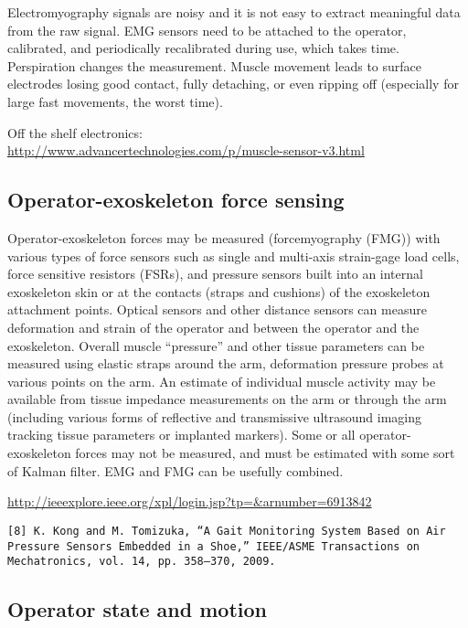 \documentclass[letterpaper,12pt,fullpage]{article}
\begin{document}
Electromyography 
signals are noisy and it is not easy to extract
meaningful data from the raw signal. 
EMG sensors
need to be attached to the operator, calibrated,
and periodically recalibrated during use, which takes time.
Perspiration changes the measurement. 
Muscle movement leads to surface electrodes losing good contact,
fully detaching, or
even ripping off (especially for large fast
movements, the worst time).

Off the shelf electronics:\\
\url{http://www.advancertechnologies.com/p/muscle-sensor-v3.html}

\subsection{Operator-exoskeleton force sensing}

Operator-exoskeleton forces may be measured (forcemyography (FMG))
with various types of
force sensors such as single and multi-axis strain-gage load cells,
force sensitive resistors (FSRs), and pressure sensors built into an internal exoskeleton skin or at the
contacts (straps and cushions) of the exoskeleton attachment points.
Optical sensors and other distance sensors can measure deformation and
strain of the operator and between the operator and the exoskeleton.
Overall muscle ``pressure'' and other tissue parameters can be measured using
elastic straps around the arm, deformation pressure probes at various
points on the arm.
An estimate of individual muscle activity
may be available from tissue impedance measurements on the arm
or through the arm (including various forms of reflective and transmissive
ultrasound imaging tracking tissue parameters or implanted markers).
Some or all operator-exoskeleton forces may not be measured, and must
be estimated with some sort of Kalman filter.
EMG and FMG can be usefully combined.

\url{http://ieeexplore.ieee.org/xpl/login.jsp?tp=&arnumber=6913842}\\

\begin{verbatim}
[8] K. Kong and M. Tomizuka, “A Gait Monitoring System Based on Air
Pressure Sensors Embedded in a Shoe,” IEEE/ASME Transactions on
Mechatronics, vol. 14, pp. 358–370, 2009.
\end{verbatim}

\subsection{Operator state and motion}
\end{document}
